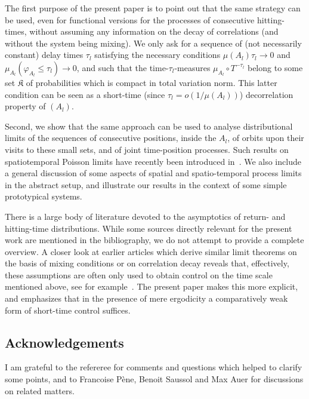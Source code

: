 \documentclass[10pt]{amsart}
\theoremstyle{definition}\newtheorem{defi}[theo]{Definition}\newtheorem{rema}[theo]{Remark}\newtheorem{exam}[theo]{Example}\newtheorem{exem}[theo]{Example}\newtheorem{nota}[theo]{Notation}
\newcommand{\frkK}{\mathfrak{K}}
\begin{document}



The first purpose of the present paper is to point out that the same strategy can be used, even for functional versions for the processes of consecutive hitting-times, without assuming any information on the decay of correlations (and without the system being mixing). We only ask for a sequence of (not necessarily constant) delay times $\tau_{l}$ satisfying the necessary conditions $\mu(A_{l})\tau_{l}\rightarrow0$ and $\mu_{A_{l}}(\varphi_{A_{l} }\leq\tau_{l})\longrightarrow0$, and such that the time-$\tau_{l}$-measures $\mu_{A_{l}}\circ T^{-\tau_{l}}$ belong to some set $\frkK$ of probabilities which is compact in total variation norm. This latter condition can be seen as a short-time (since $\tau_{l}=o(1/\mu(A_{l}))$) decorrelation property of $(A_{l})$.

Second, we show that the same approach can be used to analyse distributional limits of the sequences of consecutive positions, inside the $A_{l}$, of orbits upon their visits to these small sets, and of joint time-position processes. Such results on spatiotemporal Poisson limits have recently been introduced in~\cite{PS2}. We also include a general discussion of some aspects of spatial and spatio-temporal process limits in the abstract setup, and illustrate our results in the context of some simple prototypical systems.



There is a large body of literature devoted to the asymptotics of return- and hitting-time distributions. While some sources directly relevant for the present work are mentioned in the bibliography, we do not attempt to provide a complete overview. A closer look at earlier articles which derive similar limit theorems on the basis of mixing conditions or on correlation decay reveals that, effectively, these assumptions are often only used to obtain control on the time scale mentioned above, see for example~\cite{Ab,AS,CC,FFT1,HP,HY,PS,PS2}. The present paper makes this more explicit, and emphasizes that in the presence of mere ergodicity a comparatively weak form of short-time control suffices.

\subsection*{Acknowledgements}
I am grateful to the refereree for comments and questions which helped to clarify some points, and to Francoise Pène, Benoit Saussol and Max Auer for discussions on related matters.
\end{document}
